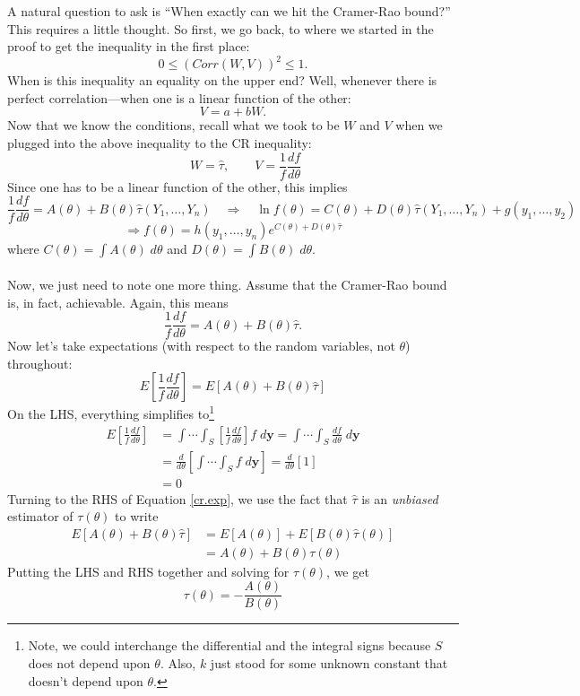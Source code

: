 \documentclass[a4paper,12pt]{scrartcl}
\begin{document}
A natural question to ask is ``When exactly can we hit the
Cramer-Rao bound?'' This requires a little thought.  So first, we
go back, to where we started in the proof to get the inequality
in the first place:
   \[ 0 \leq (Corr(W,V))^2 \leq 1.\]
When is this inequality an equality on the upper end? Well, whenever
there is perfect correlation---when one is a linear function of the
other:
   \[ V = a + bW.\]
Now that we know the conditions, recall what we took to be $W$ and
$V$ when we plugged into the above inequality to the CR inequality:
   \[ \qquad W = \hat{\tau}, \qquad V = \frac{1}{f} \frac{df}{d\theta}
      \]
Since one has to be a linear function of the other, this implies
   \[ \frac{1}{f} \frac{df}{d\theta} = A(\theta) + B(\theta)
      \hat{\tau}(Y_1,\ldots,Y_n) \quad
      \Rightarrow \quad \ln f(\theta) = C(\theta) + D(\theta)
      \hat{\tau}(Y_1,\ldots,Y_n) + g(y_1, \ldots, y_2)  \]
\begin{equation}
   \label{cr.form}
    \Rightarrow f(\theta) = h(y_1, \ldots, y_n) e^{C(\theta)
      + D(\theta)  \hat{\tau}}
   \end{equation}
where $C(\theta) = \int A(\theta) \; d\theta$ and $D(\theta) =
\int B(\theta) \; d\theta$.
\\
\\
Now, we just need to note one more thing. Assume that the Cramer-Rao
bound is, in fact, achievable. Again, this means
   \[ \frac{1}{f} \frac{df}{d\theta} = A(\theta) + B(\theta)
      \hat{\tau}.\]
Now let's take expectations (with respect to the random variables, not
$\theta$) throughout:
\begin{equation}
   \label{cr.exp}
    E\left[\frac{1}{f} \frac{df}{d\theta}\right] = E
      \left[A(\theta) + B(\theta) \hat{\tau}\right]
\end{equation}
On the LHS, everything simplifies to\footnote{
   Note, we could interchange the differential and the integral signs
because $S$ does not depend upon $\theta$. Also, $k$ just stood for
some unknown constant that doesn't depend upon $\theta$.}
   \begin{align*}
      E\left[\frac{1}{f} \frac{df}{d\theta}\right] &=
      \int \cdots \int_S \left[\frac{1}{f} \frac{df}{d\theta}\right] f
      \; d\mathbf{y} =
      \int \cdots \int_S \frac{df}{d\theta}
      \; d\mathbf{y} \\
      &= \frac{d}{d\theta}\left[\int \cdots \int_S f
      \; d\mathbf{y} \right]
      = \frac{d}{d\theta} \left[1 \right]\\
      &= 0
   \end{align*}
Turning to the RHS of Equation \ref{cr.exp}, we use the fact that
$\hat{\tau}$ is an \emph{unbiased} estimator of $\tau(\theta)$ to write
\begin{align*}
     E\left[A(\theta) + B(\theta) \hat{\tau}\right] &=
     E[ A(\theta) ] + E\left[B(\theta) \hat{\tau}(\theta)\right] \\
     &= A(\theta) + B(\theta) \tau(\theta)
\end{align*}
Putting the LHS and RHS together and solving for $\tau(\theta)$, we get
\begin{equation}
   \label{cr.tau}
   \tau(\theta) = -\frac{A(\theta)}{B(\theta)}
\end{equation}
\end{document}
